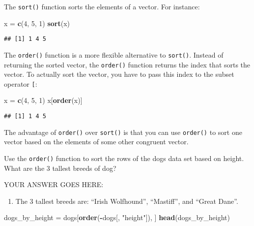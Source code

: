 \documentclass[
]{article}
\newenvironment{Shaded}{\begin{snugshade}}{\end{snugshade}}
\newcommand{\DecValTok}[1]{\textcolor[rgb]{0.00,0.00,0.81}{#1}}
\newcommand{\KeywordTok}[1]{\textcolor[rgb]{0.13,0.29,0.53}{\textbf{#1}}}
\newcommand{\NormalTok}[1]{#1}
\newcommand{\OperatorTok}[1]{\textcolor[rgb]{0.81,0.36,0.00}{\textbf{#1}}}
\newcommand{\StringTok}[1]{\textcolor[rgb]{0.31,0.60,0.02}{#1}}
\providecommand{\tightlist}{%
  \setlength{\itemsep}{0pt}\setlength{\parskip}{0pt}}
\begin{document}
The \texttt{sort()} function sorts the elements of a vector. For
instance:

\begin{Shaded}
\begin{Highlighting}[]
\NormalTok{x =}\StringTok{ }\KeywordTok{c}\NormalTok{(}\DecValTok{4}\NormalTok{, }\DecValTok{5}\NormalTok{, }\DecValTok{1}\NormalTok{)}
\KeywordTok{sort}\NormalTok{(x)}
\end{Highlighting}
\end{Shaded}

\begin{verbatim}
## [1] 1 4 5
\end{verbatim}

The \texttt{order()} function is a more flexible alternative to
\texttt{sort()}. Instead of returning the sorted vector, the
\texttt{order()} function returns the index that sorts the vector. To
actually sort the vector, you have to pass this index to the subset
operator \texttt{{[}}:

\begin{Shaded}
\begin{Highlighting}[]
\NormalTok{x =}\StringTok{ }\KeywordTok{c}\NormalTok{(}\DecValTok{4}\NormalTok{, }\DecValTok{5}\NormalTok{, }\DecValTok{1}\NormalTok{)}
\NormalTok{x[}\KeywordTok{order}\NormalTok{(x)]}
\end{Highlighting}
\end{Shaded}

\begin{verbatim}
## [1] 1 4 5
\end{verbatim}

The advantage of \texttt{order()} over \texttt{sort()} is that you can
use \texttt{order()} to sort one vector based on the elements of some
other congruent vector.

Use the \texttt{order()} function to sort the rows of the dogs data set
based on height. What are the 3 tallest breeds of dog?

YOUR ANSWER GOES HERE:

\begin{enumerate}
\def\labelenumi{\arabic{enumi}.}
\tightlist
\item
  The 3 tallest breeds are: ``Irish Wolfhound'', ``Mastiff'', and
  ``Great Dane''.
\end{enumerate}

\begin{Shaded}
\begin{Highlighting}[]
\NormalTok{dogs\_by\_height =}\StringTok{ }\NormalTok{dogs[}\KeywordTok{order}\NormalTok{(}\OperatorTok{{-}}\NormalTok{dogs[, }\StringTok{"height"}\NormalTok{]), ]}
\KeywordTok{head}\NormalTok{(dogs\_by\_height)}
\end{Highlighting}
\end{Shaded}
\end{document}
